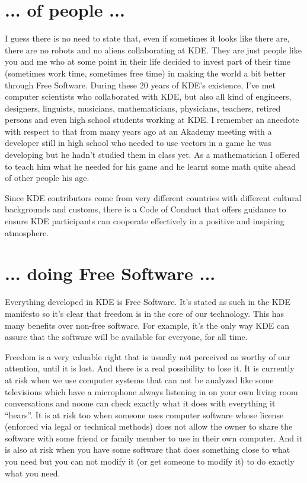 \section*{... of people ...}
I guess there is no need to state that, even if sometimes it looks like there are, there are no robots and no aliens collaborating at KDE. They are just people like you and me who at some point in their life decided to invest part of their time (sometimes work time, sometimes free time) in making the world a bit better through Free Software. During these 20 years of KDE's existence, I've met computer scientists who collaborated with KDE, but also all kind of engineers, designers, linguists, musicians, mathematicians, physicians, teachers, retired persons and even high school students working at KDE. I remember an anecdote with respect to that from many years ago at an Akademy meeting with a developer still in high school who needed to use vectors in a game he was developing but he hadn't studied them in class yet. As a mathematician I offered to teach him what he needed for his game and he learnt some math quite ahead of other people his age.

Since KDE contributors come from very different countries with different cultural backgrounds and customs, there is a Code of Conduct that offers guidance to ensure KDE participants can cooperate effectively in a positive and inspiring atmosphere.

\section*{... doing Free Software ...}
Everything developed in KDE is Free Software. It's stated as such in the KDE manifesto so it's clear that freedom is in the core of our technology. This has many benefits over non-free software. For example, it's the only way KDE can assure that the software will be available for everyone, for all time.

Freedom is a very valuable right that is usually not perceived as worthy of our attention, until it is lost. And there is a real possibility to lose it. It is currently at risk when we use computer systems that can not be analyzed like some televisions which have a microphone always listening in on your own living room conversations and noone can check exactly what it does with everything it “hears”. It is at risk too when someone uses computer software whose license (enforced via legal or technical methods) does not allow the owner to share the software with some friend or family member to use in their own computer. And it is also at risk when you have some software that does something close to what you need but you can not modify it (or get someone to modify it) to do exactly what you need.

